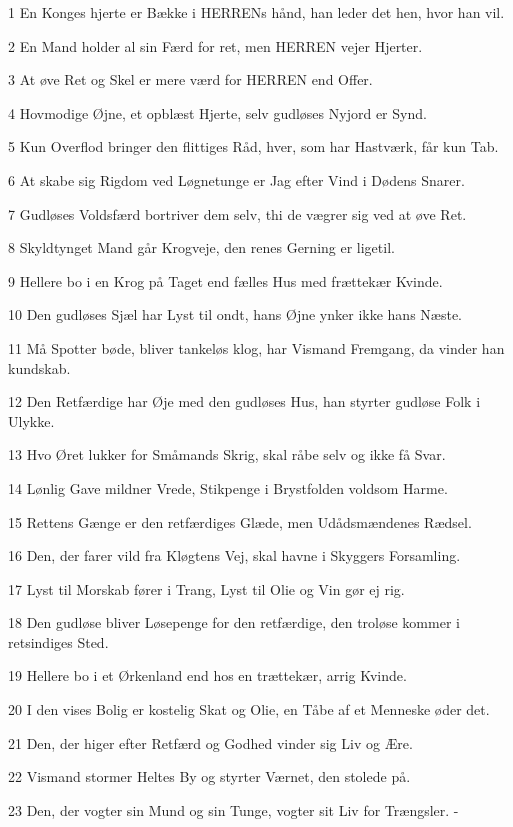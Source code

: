 \par 1 En Konges hjerte er Bække i HERRENs hånd, han leder det hen, hvor han vil.
\par 2 En Mand holder al sin Færd for ret, men HERREN vejer Hjerter.
\par 3 At øve Ret og Skel er mere værd for HERREN end Offer.
\par 4 Hovmodige Øjne, et opblæst Hjerte, selv gudløses Nyjord er Synd.
\par 5 Kun Overflod bringer den flittiges Råd, hver, som har Hastværk, får kun Tab.
\par 6 At skabe sig Rigdom ved Løgnetunge er Jag efter Vind i Dødens Snarer.
\par 7 Gudløses Voldsfærd bortriver dem selv, thi de vægrer sig ved at øve Ret.
\par 8 Skyldtynget Mand går Krogveje, den renes Gerning er ligetil.
\par 9 Hellere bo i en Krog på Taget end fælles Hus med frættekær Kvinde.
\par 10 Den gudløses Sjæl har Lyst til ondt, hans Øjne ynker ikke hans Næste.
\par 11 Må Spotter bøde, bliver tankeløs klog, har Vismand Fremgang, da vinder han kundskab.
\par 12 Den Retfærdige har Øje med den gudløses Hus, han styrter gudløse Folk i Ulykke.
\par 13 Hvo Øret lukker for Småmands Skrig, skal råbe selv og ikke få Svar.
\par 14 Lønlig Gave mildner Vrede, Stikpenge i Brystfolden voldsom Harme.
\par 15 Rettens Gænge er den retfærdiges Glæde, men Udådsmændenes Rædsel.
\par 16 Den, der farer vild fra Kløgtens Vej, skal havne i Skyggers Forsamling.
\par 17 Lyst til Morskab fører i Trang, Lyst til Olie og Vin gør ej rig.
\par 18 Den gudløse bliver Løsepenge for den retfærdige, den troløse kommer i retsindiges Sted.
\par 19 Hellere bo i et Ørkenland end hos en trættekær, arrig Kvinde.
\par 20 I den vises Bolig er kostelig Skat og Olie, en Tåbe af et Menneske øder det.
\par 21 Den, der higer efter Retfærd og Godhed vinder sig Liv og Ære.
\par 22 Vismand stormer Heltes By og styrter Værnet, den stolede på.
\par 23 Den, der vogter sin Mund og sin Tunge, vogter sit Liv for Trængsler. -
